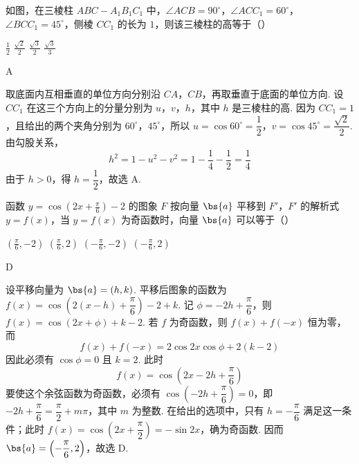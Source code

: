 \begin{problem}
如图，在三棱柱 \(ABC - A_{1}B_{1}C_{1}\) 中，\(\angle ACB = 90^{\circ}\)，\(\angle ACC_{1} = 60^{\circ}\)，\(\angle BCC_{1} = 45^{\circ}\)，侧棱 \(CC_{1}\) 的长为 \(1\)，则该三棱柱的高等于（\quad）


\choices
    {\(\frac{1}{2}\)}
    {\(\frac{\sqrt{2}}{2}\)}
    {\(\frac{\sqrt{3}}{2}\)}
    {\(\frac{\sqrt{3}}{3}\)}
\end{problem}

\begin{answer}
A
\end{answer}

\begin{solution}
取底面内互相垂直的单位方向分别沿 \(CA\)，\(CB\)，再取垂直于底面的单位方向. 设 \(CC_1\) 在这三个方向上的分量分别为 \(u\)，\(v\)，\(h\)，其中 \(h\) 是三棱柱的高. 因为 \(CC_1=1\)，且给出的两个夹角分别为 \(60^\circ\)，\(45^\circ\)，所以 \(u=\cos60^\circ=\dfrac12\)，\(v=\cos45^\circ=\dfrac{\sqrt2}{2}\). 由勾股关系，
\[
h^2=1-u^2-v^2=1-\frac14-\frac12=\frac14
\]
由于 \(h>0\)，得 \(h=\dfrac12\)，故选 A.
\end{solution}

\begin{problem}
函数 \( y = \cos \left(2x + \frac{\pi}{6}\right) - 2 \) 的图象 \(F\) 按向量 \(\bs{a}\) 平移到 \(F'\)，\(F'\) 的解析式 \( y = f(x) \)，当 \( y = f(x) \) 为奇函数时，向量 \(\bs{a}\) 可以等于（\quad）

\choices
    {\(\left(\frac{\pi}{6}, -2\right)\)}
    {\(\left(\frac{\pi}{6}, 2\right)\)}
    {\(\left(-\frac{\pi}{6}, -2\right)\)}
    {\(\left(-\frac{\pi}{6}, 2\right)\)}
\end{problem}

\begin{answer}
D
\end{answer}

\begin{solution}
设平移向量为 \(\bs{a}=(h,k)\). 平移后图象的函数为 \(f(x)=\cos\left(2(x-h)+\dfrac{\pi}{6}\right)-2+k\). 记 \(\phi=-2h+\dfrac{\pi}{6}\)，则 \(f(x)=\cos(2x+\phi)+k-2\). 若 \(f\) 为奇函数，则 \(f(x)+f(-x)\) 恒为零，而
\[
f(x)+f(-x)=2\cos2x\cos\phi+2(k-2)
\]
因此必须有 \(\cos\phi=0\) 且 \(k=2\). 此时
\[
f(x)=\cos\left(2x-2h+\frac{\pi}{6}\right)
\]
要使这个余弦函数为奇函数，必须有 \(\cos\left(-2h+\dfrac{\pi}{6}\right)=0\)，即 \(-2h+\dfrac{\pi}{6}=\dfrac{\pi}{2}+m\pi\)，其中 \(m\) 为整数. 在给出的选项中，只有 \(h=-\dfrac{\pi}{6}\) 满足这一条件；此时 \(f(x)=\cos\left(2x+\dfrac{\pi}{2}\right)=-\sin2x\)，确为奇函数. 因而 \(\bs{a}=\left(-\dfrac{\pi}{6},2\right)\)，故选 D.
\end{solution}

